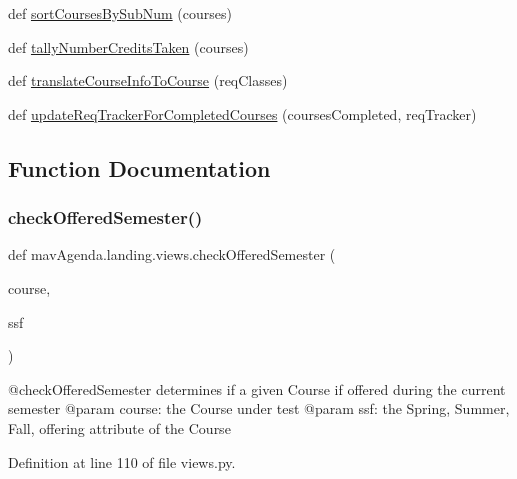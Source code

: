 \begin{DoxyCompactItemize}
\item 
def \mbox{\hyperlink{namespacemavAgenda_1_1landing_1_1views_a7bbfe5d43d84d134720962c7f10d1ffd}{sort\+Courses\+By\+Sub\+Num}} (courses)
\item 
def \mbox{\hyperlink{namespacemavAgenda_1_1landing_1_1views_a10751be31a0b978bcd8769ac78b55b8a}{tally\+Number\+Credits\+Taken}} (courses)
\item 
def \mbox{\hyperlink{namespacemavAgenda_1_1landing_1_1views_ac3facecfedd11b12fba64630c173fb1b}{translate\+Course\+Info\+To\+Course}} (req\+Classes)
\item 
def \mbox{\hyperlink{namespacemavAgenda_1_1landing_1_1views_a71b49cd4a5899b4c459df2b7761cc1f2}{update\+Req\+Tracker\+For\+Completed\+Courses}} (courses\+Completed, req\+Tracker)
\end{DoxyCompactItemize}


\subsection{Function Documentation}
\mbox{\label{namespacemavAgenda_1_1landing_1_1views_ace0cc2158ed96baa96aed788e8a79ba0}} 
\subsubsection{\texorpdfstring{check\+Offered\+Semester()}{checkOfferedSemester()}}
{\footnotesize\ttfamily def mav\+Agenda.\+landing.\+views.\+check\+Offered\+Semester (\begin{DoxyParamCaption}\item[{}]{course,  }\item[{}]{ssf }\end{DoxyParamCaption})}

\begin{DoxyVerb}@checkOfferedSemester determines if a given Course if offered during the current semester
@param course: the Course under test
@param ssf: the Spring, Summer, Fall, offering attribute of the Course
\end{DoxyVerb}
 

Definition at line 110 of file views.\+py.




